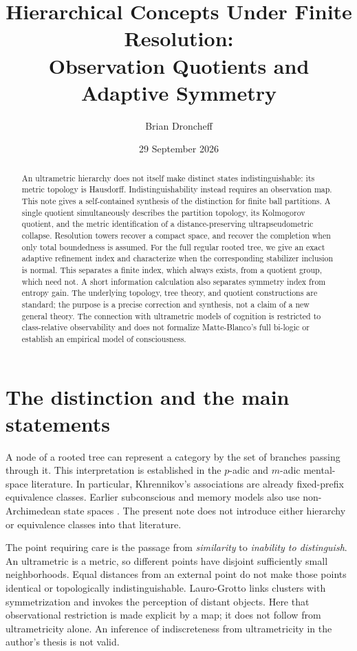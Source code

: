 \documentclass[11pt]{article}
\title{Hierarchical Concepts Under Finite Resolution:\\
Observation Quotients and Adaptive Symmetry}
\author{Brian Droncheff}
\date{29 September 2026}
\theoremstyle{definition}
\theoremstyle{remark}
\begin{document}
\maketitle
\begin{abstract}
An ultrametric hierarchy does not itself make distinct states indistinguishable: its metric topology is Hausdorff. Indistinguishability instead requires an observation map. This note gives a self-contained synthesis of the distinction for finite ball partitions. A single quotient simultaneously describes the partition topology, its Kolmogorov quotient, and the metric identification of a distance-preserving ultrapseudometric collapse. Resolution towers recover a compact space, and recover the completion when only total boundedness is assumed. For the full regular rooted tree, we give an exact adaptive refinement index and characterize when the corresponding stabilizer inclusion is normal. This separates a finite index, which always exists, from a quotient group, which need not. A short information calculation also separates symmetry index from entropy gain. The underlying topology, tree theory, and quotient constructions are standard; the purpose is a precise correction and synthesis, not a claim of a new general theory. The connection with ultrametric models of cognition is restricted to class-relative observability and does not formalize Matte-Blanco's full bi-logic or establish an empirical model of consciousness.
\end{abstract}

\section{The distinction and the main statements}
A node of a rooted tree can represent a category by the set of branches passing through it. This interpretation is established in the $p$-adic and $m$-adic mental-space literature. In particular, Khrennikov's \cite[Section 4]{Khrennikov2007} associations are already fixed-prefix equivalence classes. Earlier subconscious and memory models also use non-Archimedean state spaces \cite{Khrennikov1998,Albeverio1999}. The present note does not introduce either hierarchy or equivalence classes into that literature.

The point requiring care is the passage from \emph{similarity} to \emph{inability to distinguish}. An ultrametric is a metric, so different points have disjoint sufficiently small neighborhoods. Equal distances from an external point do not make those points identical or topologically indistinguishable. Lauro-Grotto \cite[pp.~537--539]{LauroGrotto2008} links clusters with symmetrization and invokes the perception of distant objects. Here that observational restriction is made explicit by a map; it does not follow from ultrametricity alone. An inference of indiscreteness from ultrametricity in the author's thesis \cite{Droncheff2015} is not valid.
\end{document}
